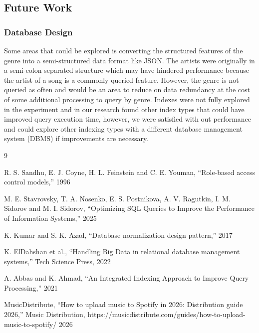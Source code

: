 \documentclass{article}
\begin{document}
\subsection{Future Work}
\subsubsection{Database Design}
Some areas that could be explored is converting the structured features of the genre into a semi-structured data format like JSON. The artists were originally in a semi-colon separated structure which may have hindered performance because the artist of a song is a commonly queried feature. However, the genre is not queried as often and would be an area to reduce on data redundancy at the cost of some additional processing to query by genre. Indexes were not fully explored in the experiment and in our research found other index types that could have improved query execution time, however, we were satisfied with out performance and could explore other indexing types with a different database management system (DBMS) if improvements are necessary.

{
\small

\begin{thebibliography}{9}

R. S. Sandhu, E. J. Coyne, H. L. Feinstein and C. E. Youman, “Role-based access control models,” 1996

M. E. Stavrovsky, T. A. Nosenko, E. S. Postnikova, A. V. Ragutkin, I. M. Sidorov and M. I. Sidorov, “Optimizing SQL Queries to Improve the Performance of Information Systems,” 2025


K. Kumar and S. K. Azad, “Database normalization design pattern,” 2017

K. ElDahshan et al., “Handling Big Data in relational database management systems,” Tech Science Press, 2022

A. Abbas and K. Ahmad, “An Integrated Indexing Approach to Improve Query Processing,” 2021

MusicDistribute, “How to upload music to Spotify in 2026: Distribution guide 2026,” Music Distribution, https://musicdistribute.com/guides/how-to-upload-music-to-spotify/ 2026


\end{thebibliography}

}


\end{document}
